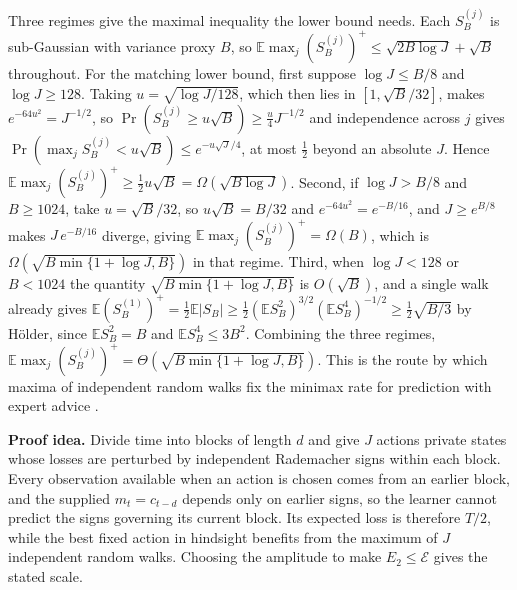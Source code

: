 \documentclass{article}
\theoremstyle{remark}
\newcommand{\Ex}{\mathbb{E}}
\newcommand{\etwo}{E_2}
\begin{document}
Three regimes give the maximal inequality the lower bound needs. Each $S_B^{(j)}$ is sub-Gaussian
with variance proxy $B$, so $\Ex\max_j(S_B^{(j)})^{+}\le\sqrt{2B\log J}+\sqrt B$ throughout. For
the matching lower bound, first suppose $\log J\le B/8$ and $\log J\ge128$. Taking
$u=\sqrt{\log J/128}$, which then lies in $[1,\sqrt B/32]$, makes $e^{-64u^2}=J^{-1/2}$, so
$\Pr(S_B^{(j)}\ge u\sqrt B)\ge\tfrac u4J^{-1/2}$ and independence across $j$ gives
$\Pr(\max_jS_B^{(j)}<u\sqrt B)\le e^{-u\sqrt J/4}$, at most $\tfrac12$ beyond an absolute $J$.
Hence $\Ex\max_j(S_B^{(j)})^{+}\ge\tfrac12u\sqrt B=\Omega(\sqrt{B\log J})$. Second, if
$\log J>B/8$ and $B\ge1024$, take $u=\sqrt B/32$, so $u\sqrt B=B/32$ and $e^{-64u^2}=e^{-B/16}$,
and $J\ge e^{B/8}$ makes $J\,e^{-B/16}$ diverge, giving
$\Ex\max_j(S_B^{(j)})^{+}=\Omega(B)$, which is $\Omega(\sqrt{B\min\{1+\log J,B\}})$ in that
regime. Third, when $\log J<128$ or $B<1024$ the quantity $\sqrt{B\min\{1+\log J,B\}}$ is
$O(\sqrt B)$, and a single walk already gives
$\Ex(S_B^{(1)})^{+}=\tfrac12\Ex|S_B|\ge\tfrac12(\Ex S_B^2)^{3/2}(\Ex S_B^4)^{-1/2}\ge\tfrac12\sqrt{B/3}$
by H\"older, since $\Ex S_B^2=B$ and $\Ex S_B^4\le3B^2$. Combining the three regimes,
$\Ex\max_j(S_B^{(j)})^{+}=\Theta(\sqrt{B\min\{1+\log J,B\}})$. This is the route by which maxima
of independent random walks fix the minimax rate for prediction with expert advice
\citep{cesabianchilugosi2006}.

\textbf{Proof idea.} Divide time into blocks of length $d$ and give $J$ actions private states
whose losses are perturbed by independent Rademacher signs within each block. Every observation
available when an action is chosen comes from an earlier block, and the supplied $m_t=c_{t-d}$
depends only on earlier signs, so the learner cannot predict the signs governing its current
block. Its expected loss is therefore $T/2$, while the best fixed action in hindsight benefits
from the maximum of $J$ independent random walks. Choosing the amplitude to make $\etwo\le\mathcal E$
gives the stated scale.
\end{document}
